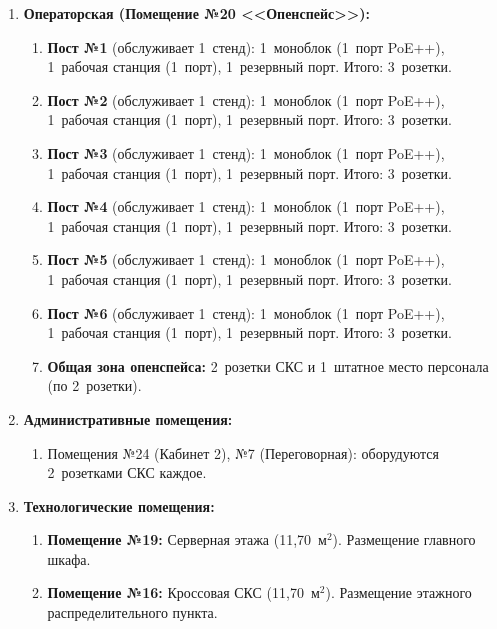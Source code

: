 \documentclass[a4paper,oneside,14pt]{extreport}
\begin{document}
\begin{appendices}
\begin{enumerate}[label=\arabic{section}.\arabic*]
    \item \textbf{Операторская (Помещение №20 <<Опенспейс>>):}
    \begin{enumerate}[label=\arabic{section}.\arabic{enumi}.\arabic*]
        \item \textbf{Пост №1} (обслуживает 1~стенд): 1~моноблок (1~порт PoE++), 1~рабочая станция (1~порт), 1~резервный порт. Итого: 3~розетки.
        \item \textbf{Пост №2} (обслуживает 1~стенд): 1~моноблок (1~порт PoE++), 1~рабочая станция (1~порт), 1~резервный порт. Итого: 3~розетки.
        \item \textbf{Пост №3} (обслуживает 1~стенд): 1~моноблок (1~порт PoE++), 1~рабочая станция (1~порт), 1~резервный порт. Итого: 3~розетки.
        \item \textbf{Пост №4} (обслуживает 1~стенд): 1~моноблок (1~порт PoE++), 1~рабочая станция (1~порт), 1~резервный порт. Итого: 3~розетки.
        \item \textbf{Пост №5} (обслуживает 1~стенд): 1~моноблок (1~порт PoE++), 1~рабочая станция (1~порт), 1~резервный порт. Итого: 3~розетки.
        \item \textbf{Пост №6} (обслуживает 1~стенд): 1~моноблок (1~порт PoE++), 1~рабочая станция (1~порт), 1~резервный порт. Итого: 3~розетки.
        \item \textbf{Общая зона опенспейса:} 2~розетки СКС и 1~штатное место персонала (по 2~розетки).
    \end{enumerate}

    \item \textbf{Административные помещения:}
    \begin{enumerate}[label=\arabic{section}.\arabic{enumi}.\arabic*]
        \item Помещения №24 (Кабинет 2), №7 (Переговорная): оборудуются 2~розетками СКС каждое.
    \end{enumerate}

    \item \textbf{Технологические помещения:}
    \begin{enumerate}[label=\arabic{section}.\arabic{enumi}.\arabic*]
        \item \textbf{Помещение №19:} Серверная этажа (11,70~м$^2$). Размещение главного шкафа.
        \item \textbf{Помещение №16:} Кроссовая СКС (11,70~м$^2$). Размещение этажного распределительного пункта.
    \end{enumerate}
\end{enumerate}


\end{appendices}
\end{document}
